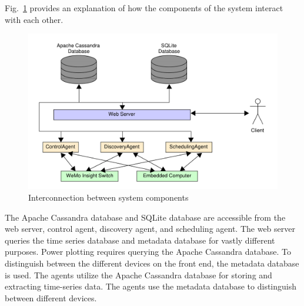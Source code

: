 \documentclass[conference]{IEEEtran}
\begin{document}
Fig.~\ref{fig:systemComponentInterconnection} provides an explanation of how
the components of the system interact with each other. %
%
\begin{figure}
  \centering
  \includegraphics[scale=0.15]{figs/overallDiagram.pdf}
  \caption{Interconnection between system components}
  \label{fig:systemComponentInterconnection}
\end{figure}
%
The Apache Cassandra database and SQLite database are accessible from the web server, control agent, discovery agent, and scheduling agent. The web server queries the time series database and metadata database for vastly different purposes. Power plotting requires querying the Apache Cassandra database. To distinguish between the different devices on the front end, the metadata database is used. The agents utilize the Apache Cassandra database for storing and extracting time-series data. The agents use the metadata database to distinguish between different devices. 




\end{document}
